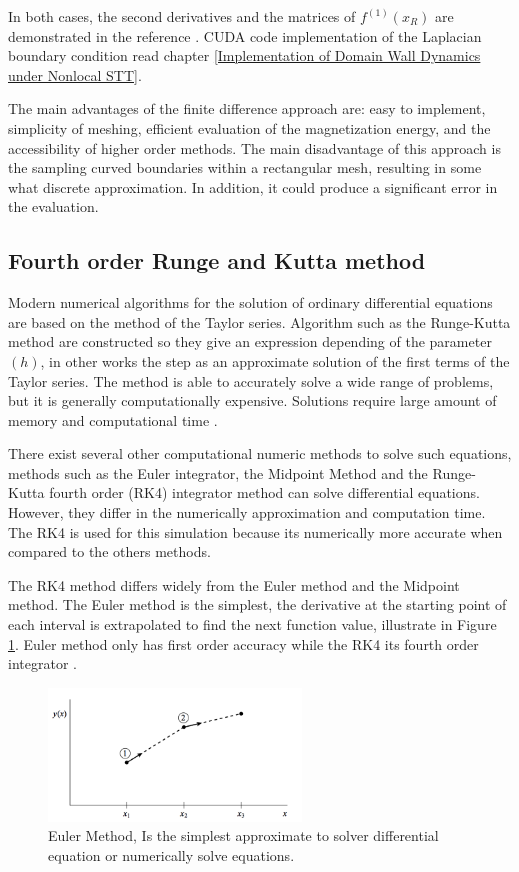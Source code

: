 In both cases, the second derivatives and the matrices of $f^{(1)}(x_R)$ are demonstrated in the reference \cite{methods}. CUDA code implementation of the Laplacian boundary condition read chapter \ref{Implementation of Domain Wall Dynamics under Nonlocal STT}.

The main advantages of the finite difference approach are: easy to implement, simplicity of meshing, efficient evaluation of the magnetization energy, and the accessibility of higher order methods. The main disadvantage of this approach is the sampling curved boundaries within a rectangular mesh, resulting in some what discrete approximation. In addition, it could produce a significant error in the evaluation.

\subsection{Fourth order Runge and Kutta method}

 Modern numerical algorithms for the solution of ordinary differential equations are based on the method of the Taylor series. Algorithm such as the Runge-Kutta method are constructed so they give an expression depending of the parameter $(h)$, in other works the step as an approximate solution of the first terms of the Taylor series. The method is able to accurately solve a wide range of problems, but it is generally computationally expensive. Solutions require large amount of memory and computational time \cite{numerical}.

There exist several other computational numeric methods to solve such equations, methods such as the Euler integrator, the Midpoint Method and the Runge-Kutta fourth order (RK4) integrator method can solve differential equations. However, they differ in the numerically approximation and computation time. The RK4 is used for this simulation because its numerically more accurate when compared to the others methods.

The RK4 method differs widely from the Euler method and the Midpoint method. The Euler method is the simplest, the derivative at the starting point of each interval is extrapolated to find the next function value, illustrate in Figure \ref{fig:euler}. Euler method only has first order accuracy while the RK4 its fourth order integrator \cite{numerical}.

\begin{figure}[htbp]
	\centering
		\includegraphics[width=0.6\textwidth]{Figures/euler.png}
		\smallskip
	\caption[Euler Method]{Euler Method, Is the simplest approximate to solver differential equation or numerically solve equations.}
	\label{fig:euler}
\end{figure}

